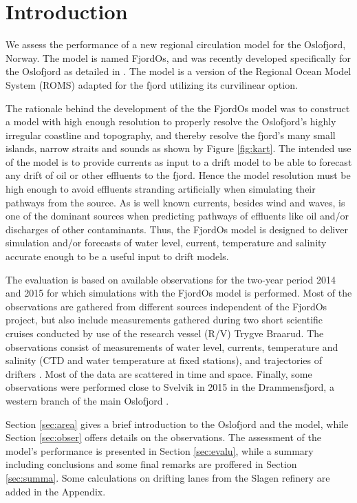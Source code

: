 
\section{Introduction}

We assess the performance of a new regional circulation model for the Oslofjord, Norway. The model is named FjordOs, and was recently developed specifically for the Oslofjord as detailed in \cite{roed:etal:2016}. The model is a version of the Regional Ocean Model System (ROMS) adapted for the fjord utilizing its curvilinear option. 

The rationale behind the development of the the FjordOs model was to construct a model with high enough resolution to properly resolve the Oslofjord's highly irregular coastline and topography, and thereby resolve the fjord's many small islands, narrow straits and sounds as shown by Figure \ref{fig:kart}. The intended use of the model is to provide currents as input to a drift model to be able to forecast any drift of oil or other effluents to the fjord. Hence the model resolution must be high enough to avoid effluents stranding artificially when simulating their pathways from the source. As is well known currents, besides wind and waves, is one of the dominant sources when predicting pathways of effluents like oil and/or discharges of other contaminants. Thus, the FjordOs model is designed to deliver simulation and/or forecasts of water level, current, temperature and salinity accurate enough to be a useful input to drift models.

The evaluation is based on available observations for the two-year period 2014 and 2015 for which simulations with the FjordOs model is performed. Most of the observations are gathered from different sources independent of the FjordOs project, but also include measurements gathered during two short scientific cruises conducted by use of the research vessel (R/V) Trygve Braarud. The observations consist of measurements of water level, currents, temperature and salinity (CTD and water temperature at fixed stations), and trajectories of drifters \citep{hjelm:etal:2016}. Most of the data are scattered in time and space. Finally, some observations were performed close to Svelvik in 2015 in the Drammensfjord, a western branch of the main Oslofjord \citep{staalstrom:2017}.

Section \ref{sec:area} gives a brief introduction to the Oslofjord and the model, while Section \ref{sec:obser} offers details on the observations. The assessment of the model's performance is presented in Section \ref{sec:evalu}, while a summary including conclusions and some final remarks are proffered in Section \ref{sec:summa}. Some calculations on drifting lanes from the Slagen refinery are added in the Appendix.

